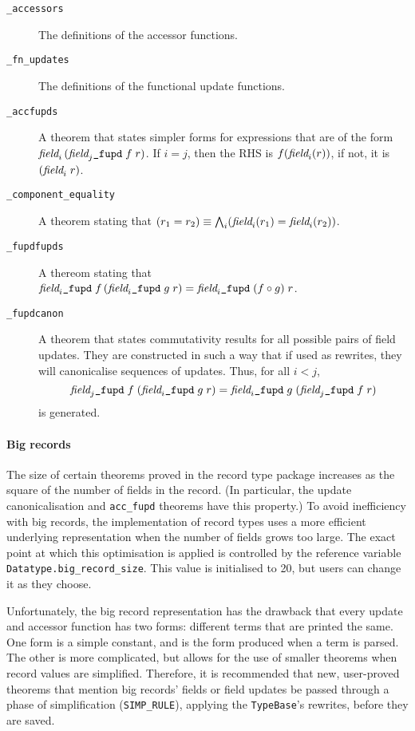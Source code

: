 \begin{description}
\item[\texttt{\_accessors}] The definitions of the accessor functions.
  \rewruse
\item[\texttt{\_fn\_updates}] The definitions of the functional update
  functions.
\item[\texttt{\_accfupds}] A theorem that states simpler forms for
  expressions that are of the form $\mbox{\it field}_{i}\, (\mbox{\it field}_{j}\mbox{\tt\_fupd}\;f\; r)$.  If
  $i = j$, then the RHS is $f (\mbox{\it field}_{i}(r))$, if not, it is $(\mbox{\it field}_{i}\;r)$.
  \rewruse
\item[\texttt{\_component\_equality}] A theorem stating that $(r_1 =
  r_2) \equiv \bigwedge_i (\mbox{\it field}_{i}(r_1) = \mbox{\it field}_{i}(r_2))$.
\item[\texttt{\_fupdfupds}] A thereom stating that $\mbox{\it field}_{i}\mbox{\tt\_fupd}
  \;f \,(\mbox{\it field}_{i}\mbox{\tt\_fupd} \;g\;r) = \mbox{\it field}_{i}\mbox{\tt\_fupd}\;(f \circ g)\;r$.
  \rewruse
\item[\texttt{\_fupdcanon}] A theorem that states commutativity results
  for all possible pairs of field updates.  They are constructed in
  such a way that if used as rewrites, they will canonicalise
  sequences of updates. Thus, for all $i < j$, \[
  \mbox{\it field}_{j}\mbox{\tt\_fupd}\;f\;(\mbox{\it field}_{i}\mbox{\tt\_fupd}\;g\;r) =
  \mbox{\it field}_{i}\mbox{\tt\_fupd}\;g\;(\mbox{\it field}_{j}\mbox{\tt\_fupd}\;f\;r)
  \] is generated.
 \rewruse
\end{description}

\paragraph{Big records} The size of certain theorems proved in the
record type package increases as the square of the number of fields in
the record.  (In particular, the update canonicalisation and
\texttt{acc\_fupd} theorems have this property.) To avoid inefficiency
with big records, the implementation of record types uses a more
efficient underlying representation when the number of fields grows
too large.  The exact point at which this optimisation is applied is
controlled by the reference variable
\texttt{Datatype.big\_record\_size}.  This value is initialised to 20,
but users can change it as they choose.

Unfortunately, the big record representation has the drawback that
every update and accessor function has two forms: different terms that
are printed the same.  One form is a simple constant, and is the form
produced when a term is parsed.  The other is more complicated, but
allows for the use of smaller theorems when record values are
simplified.  Therefore, it is recommended that new, user-proved
theorems that mention big records' fields or field updates be passed
through a phase of simplification (\texttt{SIMP\_RULE}), applying the
\texttt{TypeBase}'s rewrites, before they are saved.

